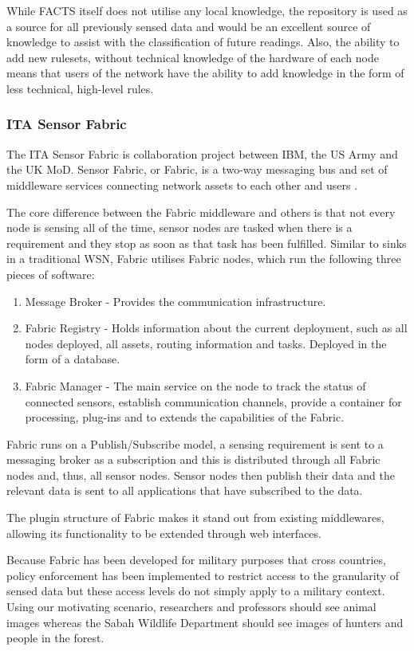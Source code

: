 		While FACTS itself does not utilise any local knowledge, the repository is used as a source for all previously sensed data and would be an excellent source of knowledge to assist with the classification of future readings. Also, the ability to add new rulesets, without technical knowledge of the hardware of each node means that users of the network have the ability to add knowledge in the form of less technical, high-level rules.

	\subsubsection{ITA Sensor Fabric}
	The ITA Sensor Fabric is collaboration project between IBM, the US Army and the UK MoD. Sensor Fabric, or Fabric, is a two-way messaging bus and set of middleware services connecting network assets to each other and users \cite{Wright2009b}.

The core difference between the Fabric middleware and others is that not every node is sensing all of the time, sensor nodes are tasked when there is a requirement and they stop as soon as that task has been fulfilled. Similar to sinks in a traditional WSN, Fabric utilises Fabric nodes, which run the following three pieces of software:
\begin{enumerate}
	\item Message Broker - Provides the communication infrastructure.
	\item Fabric Registry - Holds information about the current deployment, such as all nodes deployed, all assets, routing information and tasks. Deployed in the form of a database.
	\item Fabric Manager - The main service on the node to track the status of connected sensors, establish communication channels, provide a container for processing, plug-ins and to extends the capabilities of the Fabric.
\end{enumerate}

Fabric runs on a Publish/Subscribe model, a sensing requirement is sent to a messaging broker as a subscription and this is distributed through all Fabric nodes and, thus, all sensor nodes. Sensor nodes then publish their data and the relevant data is sent to all applications that have subscribed to the data. 

The plugin structure of Fabric makes it stand out from existing middlewares, allowing its functionality to be extended through web interfaces.

Because Fabric has been developed for military purposes that cross countries, policy enforcement has been implemented to restrict access to the granularity of sensed data but these access levels do not simply apply to a military context. Using our motivating scenario, researchers and professors should see animal images whereas the Sabah Wildlife Department should see images of hunters and people in the forest.

